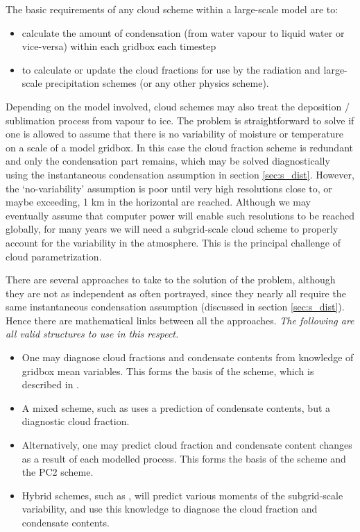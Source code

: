 \documentclass{UMDP_article}
\begin{document}
The basic requirements of any cloud scheme within a large-scale model are to:
\begin{itemize}
\item{calculate the amount of condensation (from water vapour to liquid water or vice-versa) within each gridbox each timestep}
\item{to calculate or update the cloud fractions for use by the radiation and large-scale precipitation schemes (or any other physics scheme).}
\end{itemize}

Depending on the model involved, cloud schemes may also treat the
deposition / sublimation process from vapour to ice. The problem is
straightforward to solve if one is allowed to assume that there is no
variability of moisture or temperature on a scale of a model gridbox. 
In this case the cloud fraction scheme is redundant and only the condensation
part remains, which may be solved diagnostically using the instantaneous
condensation assumption in section \ref{sec:s_dist}. However, the
`no-variability' assumption is poor until
very high resolutions close to, or maybe exceeding, 1 km in the horizontal
are reached. Although we may eventually assume that computer power
will enable such resolutions to be reached globally, for many years we
will need a subgrid-scale cloud scheme to properly account for the
variability in the atmosphere. This is the principal challenge of
cloud parametrization.

There are several approaches to take to the solution of the problem,
although they are not as independent as often portrayed, since they
nearly all require the same instantaneous condensation assumption
(discussed in section \ref{sec:s_dist}). Hence there are mathematical
links between
all the approaches. \textit{The following are all valid structures
to use in this respect.}
\begin{itemize}
\item{One may diagnose cloud fractions and condensate contents from knowledge of gridbox mean variables. This forms the basis of the \cite{smith90} scheme, which is described in
.} 
\item{A mixed scheme, such as \cite{sundqvist1978} uses a prediction of condensate contents, but a diagnostic cloud fraction.}
\item{Alternatively, one may predict cloud fraction and condensate content changes as a result of each modelled process. This forms the basis of the \cite{t93} scheme and the PC2 scheme.}
\item{Hybrid schemes, such as \cite{t02}, will predict various moments of the subgrid-scale variability, and use this knowledge to diagnose the cloud fraction and condensate contents.}
\end{itemize}
\end{document}
